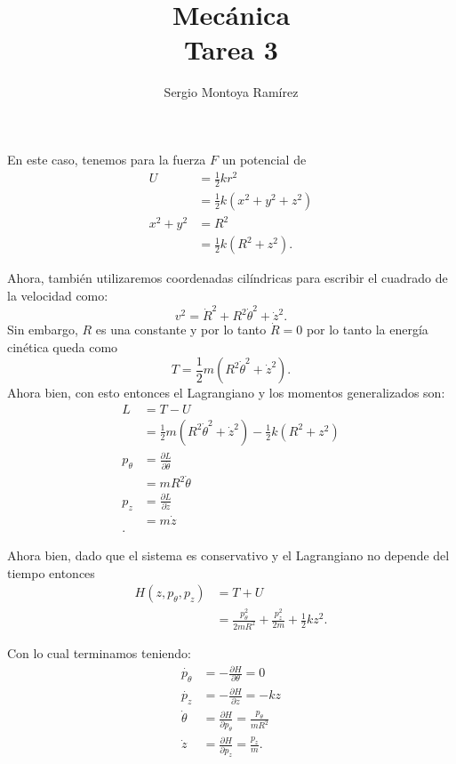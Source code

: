 \documentclass{report}
\title{\Huge{Mecánica}\\Tarea 3}
\author{\huge{Sergio Montoya Ramírez}}
\date{}
\begin{document}
\maketitle
\newpage%
\tableofcontents
\pagebreak

\chapter{}

En este caso, tenemos para la fuerza $F$ un potencial de
\begin{align*}
  U &= \frac{1}{2}kr^2 \\
  &= \frac{1}{2}k\left( x^2 + y^2 + z^2 \right)  \\
  x^2 + y^2 &= R^2 \\
  &= \frac{1}{2}k\left( R^2 + z^2 \right)
.\end{align*}

Ahora, también utilizaremos coordenadas cilíndricas para escribir el cuadrado de la velocidad como: \[
  v^2 = \dot{R}^2 + R^2\dot{\theta}^2 + \dot{z}^2
.\] Sin embargo, $R$ es una constante y por lo tanto $\dot{R} = 0$ por lo tanto la energía cinética queda como \[
T = \frac{1}{2}m\left( R^2\dot{\theta}^2 + \dot{z}^2 \right) 
.\] Ahora bien, con esto entonces el Lagrangiano y los momentos generalizados son:
\begin{align*}
  L &= T - U \\
  &= \frac{1}{2}m\left( R^2\dot{\theta}^2 + \dot{z}^2 \right) - \frac{1}{2}k\left( R^2 + z^2 \right)  \\
  p_\theta &= \frac{\partial L}{\partial \dot{\theta}}  \\
  &= mR^2\dot{\theta} \\
  p_z &= \frac{\partial L}{\partial \dot{z}}  \\
  &= m\dot{z} \\
.\end{align*}

Ahora bien, dado que el sistema es conservativo y el Lagrangiano no depende del tiempo entonces
\begin{align*}
  H\left( z, p_\theta, p_z \right) &= T + U \\
  &= \frac{p_\theta^2}{2mR^2} + \frac{p_z^2}{2m} + \frac{1}{2}kz^2
.\end{align*}

Con lo cual terminamos teniendo:
\begin{align*}
  \dot{p_\theta} &= - \frac{\partial H}{\partial \theta} = 0 \\
  \dot{p_z} &= - \frac{\partial H}{\partial z} = -kz \\
  \dot{\theta} &= \frac{\partial H}{\partial p_\theta} = \frac{p_\theta}{mR^2} \\
  \dot{z} &= \frac{\partial H}{\partial p_z} = \frac{p_z}{m}
.\end{align*}
\end{document}
